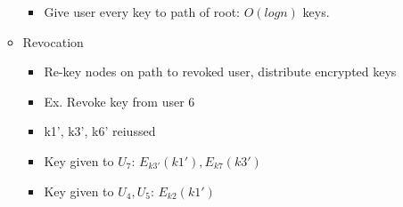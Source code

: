 \begin{itemize}
\begin{itemize}
\begin{itemize}
        \item Give user every key to path of root: $O(log n)$ keys.     
        \end{itemize}
    \item Revocation
        \begin{itemize}
        \item Re-key nodes on path to revoked user, distribute encrypted keys
        \item Ex. Revoke key from user 6
        \item k1', k3', k6' reiussed
        \item Key given to $U_7$: $E_{k3'}(k1'), E_{k7}(k3')$
        \item Key given to $U_4, U_5$: $E_{k2}(k1')$
        \end{itemize}
    \end{itemize}
\end{itemize}